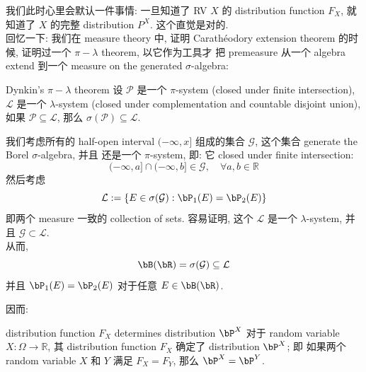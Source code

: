\begin{remark}
    我们此时心里会默认一件事情: 一旦知道了 RV \(X\) 的 distribution function 
    \(F_X\), 就知道了 \(X\) 的完整 distribution \(P^X\).
    这个直觉是对的. \\
    回忆一下: 我们在 measure theory 中, 
    证明 Carathéodory extension theorem 的时候, 
    证明过一个 \(\pi-\lambda\) theorem, 以它作为工具才
    把 premeasure 从一个 algebra extend 
    到一个 measure on the generated \(\sigma\)-algebra:
    \begin{theorem}{Dynkin's \(\pi-\lambda\) theorem}
        设 \(\mathcal{P}\) 是一个 \(\pi\)-system (closed under finite intersection), \(\mathcal{L}\) 是一个 \(\lambda\)-system 
        (closed under complementation and countable disjoint union), 
        如果 \(\mathcal{P} \subseteq \mathcal{L}\), 那么 \(\sigma(\mathcal{P}) \subseteq \mathcal{L}\).
    \end{theorem}
    
    我们考虑所有的 half-open interval \((-\infty,x]\) 组成的集合
     \(\mathcal{G}\), 这个集合 generate the Borel \(\sigma\)-algebra, 并且
     还是一个 \(\pi\)-system, 即: 它 closed under finite intersection:
     \[
     (-\infty, a] \cap (-\infty, b] \in \mathcal{G}, \quad \forall a,b \in \mathbb{R}
     \]
     然后考虑 \[
     \mathcal{L} := \{E \in \sigma(\mathcal{G}) : \bP_1(E) = \bP_2(E)\}
     \]
     即两个 measure 一致的 collection of sets.
     容易证明, 这个 \(\mathcal{L}\) 是一个 \(\lambda\)-system, 并且 \(\mathcal{G} \subset \mathcal{L}\).\\
     从而, \[\bB(\bR) =  \sigma(\mathcal{G}) \subseteq \mathcal{L}\] 并且 \(\bP_1(E) = \bP_2(E)\) 
     对于任意 \(E \in \bB(\bR)\).

     因而:
     \begin{corollary}{distribution function \(F_X\) determines distribution \(\bP^X\)}
         对于 random variable \(X: \Omega \to \mathbb{R}\), 其 distribution function \(F_X\) 确定了 distribution \(\bP^X\); 即
         如果两个 random variable \(X\) 和 \(Y\) 满足 \(F_X = F_Y\), 那么 \(\bP^X = \bP^Y\).
     \end{corollary}
\end{remark}


